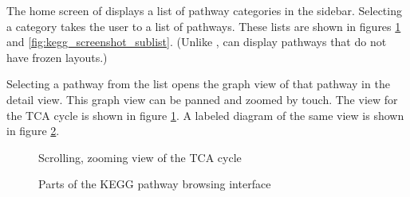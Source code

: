 The home screen of \keggapp displays a list of pathway categories in the
sidebar. Selecting a category takes the user to a list of pathways. These lists
are shown in figures \ref{fig:kegg_screenshot_pathway} and
\ref{fig:kegg_screenshot_sublist}.  (Unlike \mawapp, \keggapp can
display pathways that do not have frozen layouts.)

Selecting a pathway from the list opens the graph view of that pathway in the
detail view. This graph view can be panned and zoomed by touch. The view for
the TCA cycle is shown in figure \ref{fig:kegg_screenshot_pathway}. A labeled
diagram of the same view is shown in figure \ref{fig:kegg_pathway_diagram}.

\begin{figure}[hbt]
    \caption{\label{fig:kegg_screenshot_pathway} Scrolling, zooming view of
    the TCA cycle}
\end{figure}

\begin{figure}[hbt]
    \caption{\label{fig:kegg_pathway_diagram} Parts of the KEGG pathway browsing
    interface}
\end{figure}

